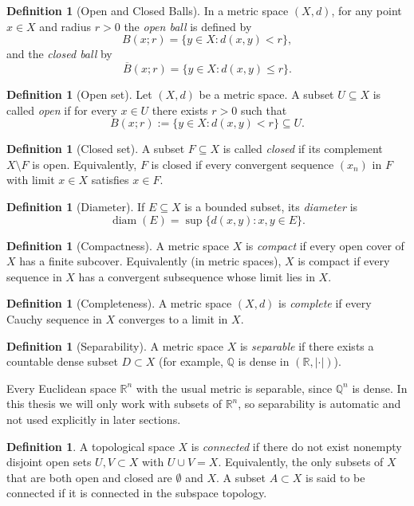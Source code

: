 \documentclass{article}
\theoremstyle{plain}
\theoremstyle{definition}
\newtheorem{defn}[thm]{Definition}
\DeclareMathOperator{\diam}{diam}
\theoremstyle{remark}
\begin{document}
\begin{defn}[Open and Closed Balls]
In a metric space $(X,d)$, for any point $x\in X$ and radius $r>0$ the \emph{open ball} is defined by 
\[
B(x;r)=\{y\in X: d(x,y)<r\},
\] 
and the \emph{closed ball} by 
\[
\overline B(x;r)=\{y\in X: d(x,y)\le r\}.
\] 
\end{defn}

\begin{defn}[Open set]
Let $(X,d)$ be a metric space. A subset $U \subseteq X$ is called \emph{open} if for every $x \in U$ there exists $r>0$ such that 
\[
B(x;r) := \{ y \in X : d(x,y) < r \} \subseteq U.
\]
\end{defn}

\begin{defn}[Closed set]
A subset $F \subseteq X$ is called \emph{closed} if its complement $X \setminus F$ is open. 
Equivalently, $F$ is closed if every convergent sequence $(x_n)$ in $F$ with limit $x \in X$ satisfies $x \in F$.
\end{defn}


\begin{defn}[Diameter]
If $E\subseteq X$ is a bounded subset, its \emph{diameter} is 
\[
\diam(E)=\sup\{d(x,y): x,y\in E\}.
\] 
\end{defn}

\begin{defn}[Compactness]
A metric space $X$ is \emph{compact} if every open cover of $X$ has a finite subcover. Equivalently (in metric spaces), $X$ is compact if every sequence in $X$ has a convergent subsequence whose limit lies in $X$. 
\end{defn}

\begin{defn}[Completeness]
A metric space $(X,d)$ is \emph{complete} if every Cauchy sequence in $X$ converges to a limit in $X$. 
\end{defn}

\begin{defn}[Separability]
A metric space $X$ is \emph{separable} if there exists a countable dense subset $D\subset X$ (for example, $\mathbb Q$ is dense in $(\mathbb R,|\cdot|)$). 
\end{defn}
Every Euclidean space $\mathbb{R}^n$ with the usual metric is separable, since $\mathbb{Q}^n$ is dense. 
In this thesis we will only work with subsets of $\mathbb{R}^n$, so separability is automatic and not used explicitly in later sections.

\begin{defn}
A topological space $X$ is \emph{connected} if there do not exist nonempty disjoint open sets $U,V\subset X$ with $U\cup V = X$. Equivalently, the only subsets of $X$ that are both open and closed are $\emptyset$ and $X$. A subset $A\subset X$ is said to be connected if it is connected in the subspace topology.
\end{defn}
\end{document}

